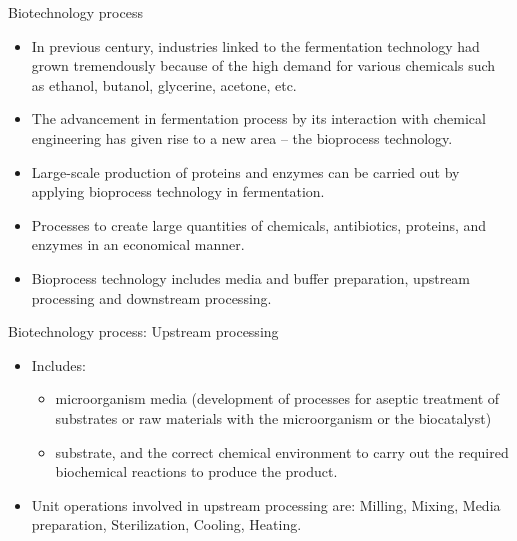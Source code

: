 \documentclass[ignorenonframetext,aspectratio=169]{beamer}
\providecommand{\tightlist}{%
  \setlength{\itemsep}{0pt}\setlength{\parskip}{0pt}}
\begin{document}
\begin{frame}{Biotechnology process}
\protect\hypertarget{biotechnology-process}{}

\begin{itemize}
\tightlist
\item
  In previous century, industries linked to the fermentation technology
  had grown tremendously because of the high demand for various
  chemicals such as ethanol, butanol, glycerine, acetone, etc.
\item
  The advancement in fermentation process by its interaction with
  chemical engineering has given rise to a new area -- the bioprocess
  technology.
\item
  Large-scale production of proteins and enzymes can be carried out by
  applying bioprocess technology in fermentation.
\item
  Processes to create large quantities of chemicals, antibiotics,
  proteins, and enzymes in an economical manner.
\item
  Bioprocess technology includes media and buffer preparation, upstream
  processing and downstream processing.
\end{itemize}

\end{frame}

\begin{frame}{Biotechnology process: Upstream processing}
\protect\hypertarget{biotechnology-process-upstream-processing}{}

\begin{itemize}
\tightlist
\item
  Includes:

  \begin{itemize}
  \tightlist
  \item
    microorganism media (development of processes for aseptic treatment
    of substrates or raw materials with the microorganism or the
    biocatalyst)
  \item
    substrate, and the correct chemical environment to carry out the
    required biochemical reactions to produce the product.
  \end{itemize}
\item
  Unit operations involved in upstream processing are: Milling, Mixing,
  Media preparation, Sterilization, Cooling, Heating.
\end{itemize}

\end{frame}
\end{document}
